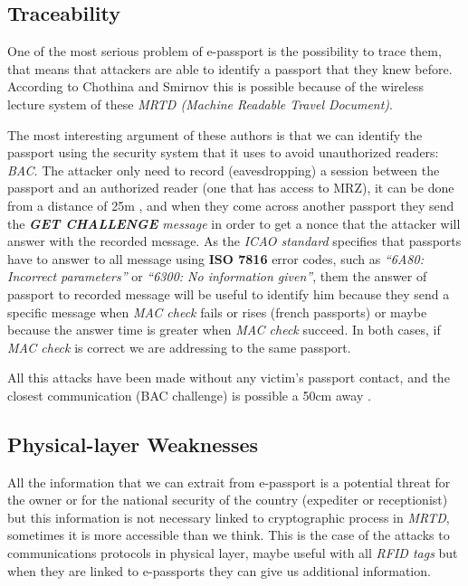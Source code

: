 \documentclass{acm_proc_article-sp}
\begin{document}
\subsection{Traceability}
\label{subsec:trace}

One of the most serious problem of e-passport is the possibility to trace them, that means that  
attackers are able to identify a passport that they knew before. According to Chothina and Smirnov 
\cite{CHTOM2010} this is possible because of the wireless lecture system of these 
\textit{MRTD (Machine Readable Travel Document)}.

The most interesting argument of these authors \cite{CHTOM2010} is that we can identify the passport using the 
security system that it uses to avoid unauthorized readers: \textit{BAC}. The attacker only need to record 
(eavesdropping) a session between the passport and an authorized reader (one that has access to MRZ), 
it can be done from a distance of 25m \cite{02COPA}, and when they come across another passport they send 
the \textit{\textbf{GET CHALLENGE} message} in order to get a nonce that the attacker will answer with the recorded message. 
As the \textit{ICAO standard} specifies that passports have to answer to all message using \textbf{ISO 7816} error codes, 
such as \textit{``6A80: Incorrect parameters''} or \textit{``6300: No information given''}, them the answer of passport to 
recorded message will be useful to identify him because they send a specific message when \textit{MAC check} 
fails or rises  (french passports) or maybe because the answer time is greater when \textit{MAC check} succeed. 
In both cases, if \textit{MAC check} is correct we are addressing to the same passport.

All this attacks have been made without any victim’s passport contact, and the closest communication 
(BAC challenge) is possible a 50cm away \cite{CHTOM2010}.

\subsection{Physical-layer Weaknesses}
\label{subsec:phy}
All the information that we can extrait from e-passport is a potential threat for the owner or for 
the national security of the country (expediter or receptionist) but this information is not necessary 
linked to cryptographic process in \textit{MRTD}, sometimes it is more accessible than we think. This is the 
case of the attacks to communications protocols in physical layer, maybe useful with all \textit{RFID tags} 
but when they are linked to e-passports they can give us additional information.
\end{document}
